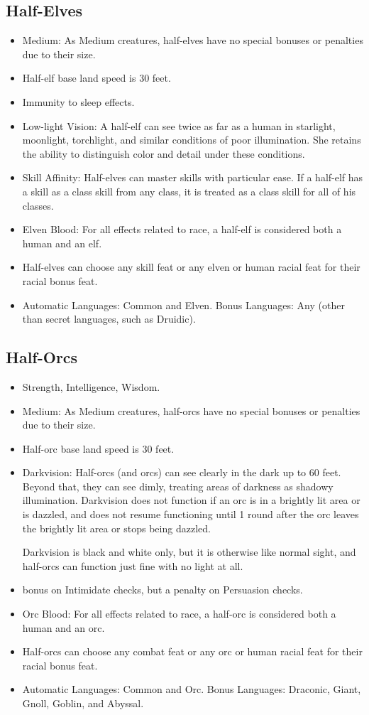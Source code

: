 \subsection{Half-Elves}
\begin{itemize}
\item Medium: As Medium creatures, half-elves have no special bonuses or penalties due to their size.
\item Half-elf base land speed is 30 feet.
\item Immunity to sleep effects.
\item Low-light Vision: A half-elf can see twice as far as a human in starlight, moonlight, torchlight, and similar conditions of poor illumination. She retains the ability to distinguish color and detail under these conditions.
 \item Skill Affinity: Half-elves can master skills with particular ease. If a half-elf has a skill as a class skill from any class, it is treated as a class skill for all of his classes.
\item Elven Blood: For all effects related to race, a half-elf is considered both a human and an elf.
\item Half-elves can choose any skill feat or any elven or human racial feat for their racial bonus feat.
\item Automatic Languages: Common and Elven. Bonus Languages: Any (other than secret languages, such as Druidic).
\end{itemize}

\subsection{Half-Orcs}
\begin{itemize}
\item {} Strength,  Intelligence,  Wisdom.
\item Medium: As Medium creatures, half-orcs have no special bonuses or penalties due to their size.
\item Half-orc base land speed is 30 feet.
\item Darkvision: Half-orcs (and orcs) can see clearly in the dark up to 60 feet.  Beyond that, they can see dimly, treating areas of darkness as shadowy illumination. Darkvision does not function if an orc is in a brightly lit area or is dazzled, and does not resume functioning until 1 round after the orc leaves the brightly lit area or stops being dazzled.
\par Darkvision is black and white only, but it is otherwise like normal sight, and half-orcs can function just fine with no light at all.
\item {} bonus on Intimidate checks, but a  penalty on Persuasion checks.
\item Orc Blood: For all effects related to race, a half-orc is considered both a human and an orc.
\item Half-orcs can choose any combat feat or any orc or human racial feat for their racial bonus feat.
\item Automatic Languages: Common and Orc. Bonus Languages: Draconic, Giant, Gnoll, Goblin, and Abyssal.
\end{itemize}

